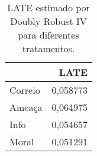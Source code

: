 \begin{table}
\centering
\caption{LATE estimado por Doubly Robust IV para diferentes tratamentos.}
\label{tab:driv-late}
\begin{tabular}{lr}
\toprule\toprule
{} &      LATE \\
\midrule
Correio &  0,058773 \\
Ameaça  &  0,064975 \\
Info    &  0,054657 \\
Moral   &  0,051291 \\
\bottomrule\bottomrule
\end{tabular}
\end{table}
